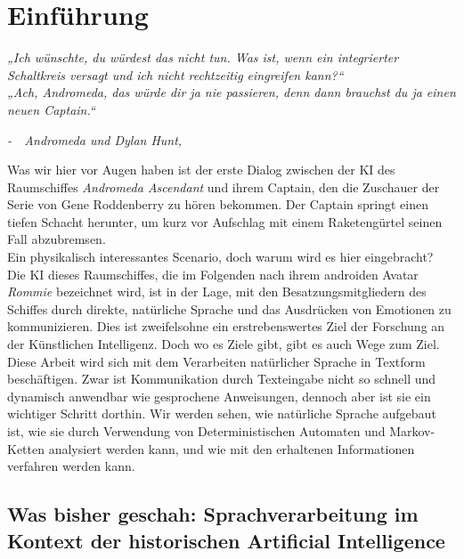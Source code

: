 \documentclass[12pt,twoside]{article}
\theoremstyle{plain}
\theoremstyle{definition}
\theoremstyle{remark}
\begin{document}
\setcounter{tocdepth}{2} 					%
\tableofcontents
{}
\clearpage



\section{Einführung}
\label{sec:intro}
	\textit{„Ich wünschte, du würdest das nicht tun.
	Was ist, wenn ein integrierter Schaltkreis versagt und ich nicht rechtzeitig eingreifen kann?“\\
	„Ach, Andromeda, das würde dir ja nie passieren, denn dann brauchst du ja einen neuen Captain.“}
	\begin{flushright}
		\textit{-~~Andromeda und Dylan Hunt, \cite{ADA101}}
	\end{flushright}
	Was wir hier vor Augen haben ist der erste Dialog zwischen der KI des Raumschiffes \textit{Andromeda Ascendant} und ihrem Captain, den die Zuschauer der Serie von Gene Roddenberry zu hören bekommen.
	Der Captain springt einen tiefen Schacht herunter, um kurz vor Aufschlag mit einem Raketengürtel seinen Fall abzubremsen.\\
	Ein physikalisch interessantes Scenario, doch warum wird es hier eingebracht?\\
	Die KI dieses Raumschiffes, die im Folgenden nach ihrem androiden Avatar \textit{Rommie} bezeichnet wird, ist in der Lage, mit den Besatzungsmitgliedern des Schiffes durch direkte, natürliche Sprache und das Ausdrücken von Emotionen zu kommunizieren.
	Dies ist zweifelsohne ein erstrebenswertes Ziel der Forschung an der Künstlichen Intelligenz.
	Doch wo es Ziele gibt, gibt es auch Wege zum Ziel.
	Diese Arbeit wird sich mit dem Verarbeiten natürlicher Sprache in Textform beschäftigen.
	Zwar ist Kommunikation durch Texteingabe nicht so schnell und dynamisch anwendbar wie gesprochene Anweisungen, dennoch aber ist sie ein wichtiger Schritt dorthin.
	Wir werden sehen, wie natürliche Sprache aufgebaut ist, wie sie durch Verwendung von Deterministischen Automaten und Markov-Ketten analysiert werden kann, und wie mit den erhaltenen Informationen verfahren werden kann.
	\subsection{Was bisher geschah: Sprachverarbeitung im Kontext der historischen Artificial Intelligence}
	\label{ssec:history}
\end{document}
